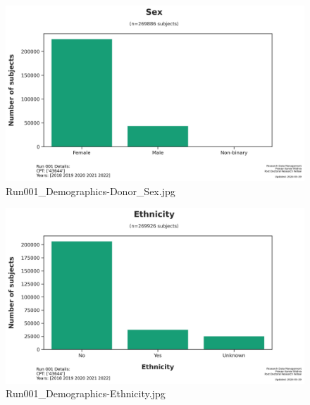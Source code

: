 \documentclass[
  letterpaper,
  DIV=11,
  numbers=noendperiod]{scrartcl}
\begin{document}
\begin{figure}[H]

{\centering \includegraphics{figures/demographics/Run001_Demographics-Donor_Sex.jpg}

}

\caption{Run001\_Demographics-Donor\_Sex.jpg}

\end{figure}%
\begin{figure}[H]

{\centering \includegraphics{figures/demographics/Run001_Demographics-Ethnicity.jpg}

}

\caption{Run001\_Demographics-Ethnicity.jpg}

\end{figure}%
\end{document}
